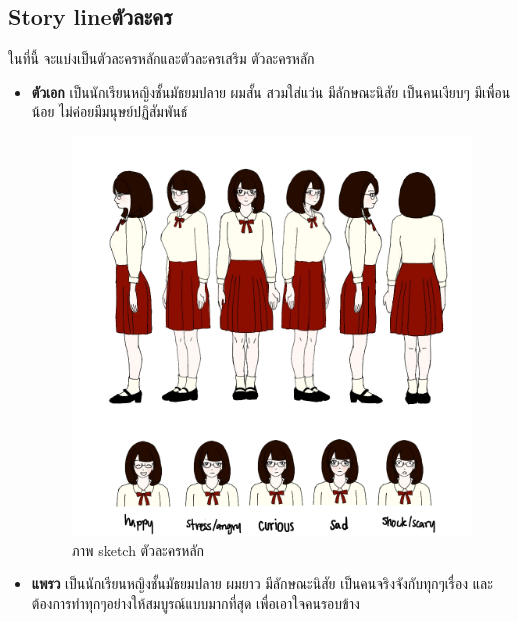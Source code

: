 \subsection{\ifenglish Story line\else ตัวละคร\fi }
ในที่นี้ จะแบ่งเป็นตัวละครหลักและตัวละครเสริม
\subitem ตัวละครหลัก
\begin{itemize}
    \item \textbf{ตัวเอก} เป็นนักเรียนหญิงชั้นมัธยมปลาย ผมสั้น สวมใส่แว่น มีลักษณะนิสัย เป็นคนเงียบๆ มีเพื่อนน้อย ไม่ค่อยมีมนุษย์ปฏิสัมพันธ์
    \begin{figure}[h]
        \centering
        \includegraphics[scale=0.15]{Images/demo_character.jpg}
        \caption{ภาพ sketch ตัวละครหลัก}\label{MainCharacter}
    \end{figure}
    \item \textbf{แพรว} เป็นนักเรียนหญิงชั้นมัธยมปลาย ผมยาว มีลักษณะนิสัย เป็นคนจริงจังกับทุกๆเรื่อง และต้องการทำทุกๆอย่างให้สมบูรณ์แบบมากที่สุด เพื่อเอาใจคนรอบข้าง
    \begin{figure}[h]
        \centering

\end{figure}
\end{itemize}
